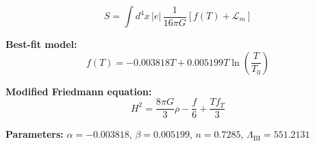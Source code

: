 
\begin{equation}
  S = \int d^4x \, |e| \, \frac{1}{16\pi G} \left[ f(T) + \mathcal{L}_m \right]
\end{equation}

\textbf{Best-fit model:}
\begin{equation}
  f(T) = -0.003818 T + 0.005199 T \ln\!\left(\frac{T}{T_0}\right)
\end{equation}

\textbf{Modified Friedmann equation:}
\begin{equation}
  H^2 = \frac{8\pi G}{3} \rho - \frac{f}{6} + \frac{T f_T}{3}
\end{equation}

\textbf{Parameters:}
$\alpha = -0.003818$, \quad
$\beta = 0.005199$, \quad
$n = 0.7285$, \quad
$\Lambda_{\text{BI}} = 551.2131$
